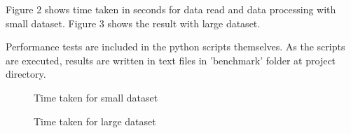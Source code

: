 \documentclass[9pt,twocolumn,twoside]{../../styles/osajnl}
\begin{document}
Figure 2 shows time taken in seconds for data read and data processing with small dataset. Figure 3 shows the result with large dataset.

Performance tests are included in the python scripts themselves. As the scripts are executed, results are written in text files in 'benchmark' folder at project directory.

\begin{figure}[htbp]
\centering
{}
\caption{Time taken for small dataset} 
\label{fig:figure2}
\end{figure}


\begin{figure}[htbp]
\centering
{}
\caption{Time taken for large dataset} 
\label{fig:figure3}
\end{figure}
\end{document}

